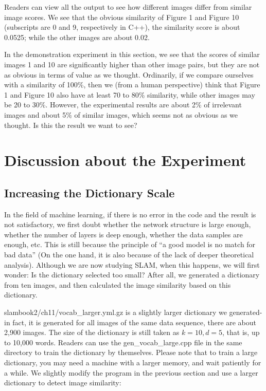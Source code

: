 Readers can view all the output to see how different images differ from similar image scores. We see that the obvious similarity of Figure 1 and Figure 10 (subscripts are 0 and 9, respectively in C++), the similarity score is about 0.0525; while the other images are about 0.02.

In the demonstration experiment in this section, we see that the scores of similar images 1 and 10 are significantly higher than other image pairs, but they are not as obvious in terms of value as we thought. Ordinarily, if we compare ourselves with a similarity of 100\%, then we (from a human perspective) think that Figure 1 and Figure 10 also have at least 70 to 80\% similarity, while other images may be 20 to 30\%. However, the experimental results are about 2\% of irrelevant images and about 5\% of similar images, which seems not as obvious as we thought. Is this the result we want to see?

\section{Discussion about the Experiment}
\subsection{Increasing the Dictionary Scale}
In the field of machine learning, if there is no error in the code and the result is not satisfactory, we first doubt whether the network structure is large enough, whether the number of layers is deep enough, whether the data samples are enough, etc. This is still because the principle of ``a good model is no match for bad data'' (On the one hand, it is also because of the lack of deeper theoretical analysis). Although we are now studying SLAM, when this happens, we will first wonder: Is the dictionary selected too small? After all, we generated a dictionary from ten images, and then calculated the image similarity based on this dictionary.

slambook2/ch11/vocab\_larger.yml.gz is a slightly larger dictionary we generated-in fact, it is generated for all images of the same data sequence, there are about 2,900 images. The size of the dictionary is still taken as $k=10,d=5$, that is, up to 10,000 words. Readers can use the gen\_vocab\_large.cpp file in the same directory to train the dictionary by themselves. Please note that to train a large dictionary, you may need a machine with a larger memory, and wait patiently for a while. We slightly modify the program in the previous section and use a larger dictionary to detect image similarity:


